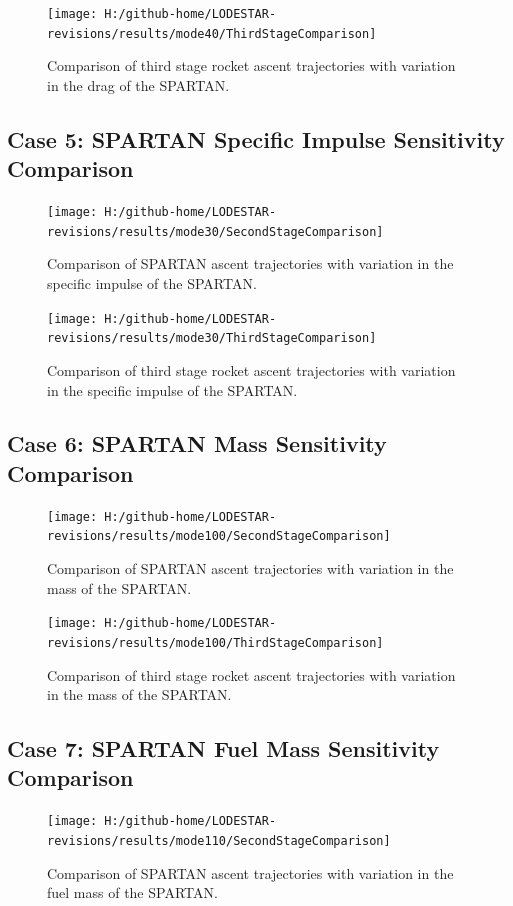 \begin{figure}[!th]
\centering
\texttt{[image: H:/github-home/LODESTAR-revisions/results/mode40/ThirdStageComparison]}
\caption{Comparison of third stage rocket ascent trajectories with variation in the drag of the SPARTAN.}
\label{fig:ThirdStageComparison3}
\end{figure}
\FloatBarrier
\clearpage
\subsection{Case 5: SPARTAN Specific Impulse Sensitivity Comparison}\label{sec:app_comparison30}


\begin{figure}[!th]
	\centering
	\texttt{[image: H:/github-home/LODESTAR-revisions/results/mode30/SecondStageComparison]}
	\caption{Comparison of SPARTAN ascent trajectories with variation in the specific impulse of the SPARTAN.}
	\label{fig:SecondStageComparison2}
	
\end{figure}
\begin{figure}[!th]
	\centering
	\texttt{[image: H:/github-home/LODESTAR-revisions/results/mode30/ThirdStageComparison]}
	\caption{Comparison of third stage rocket ascent trajectories with variation in the specific impulse of the SPARTAN.}
	\label{fig:ThirdStageComparison2}
\end{figure}
\FloatBarrier
\clearpage
\subsection{Case 6: SPARTAN Mass Sensitivity Comparison}\label{sec:app_comparison100}

\begin{figure}[!th]
\centering
\texttt{[image: H:/github-home/LODESTAR-revisions/results/mode100/SecondStageComparison]}
\caption{Comparison of SPARTAN ascent trajectories with variation in the mass of the SPARTAN.}
\label{fig:SecondStageComparison4}
\end{figure}

\begin{figure}[!th]
\centering
\texttt{[image: H:/github-home/LODESTAR-revisions/results/mode100/ThirdStageComparison]}
\caption{Comparison of third stage rocket ascent trajectories with variation in the mass of the SPARTAN.}
\label{fig:ThirdStageComparison4}
\end{figure}
\FloatBarrier
\clearpage
\subsection{Case 7: SPARTAN Fuel Mass Sensitivity Comparison}\label{sec:app_comparison110}
\begin{figure}[!th]
\centering
\texttt{[image: H:/github-home/LODESTAR-revisions/results/mode110/SecondStageComparison]}
\caption{Comparison of SPARTAN ascent trajectories with variation in the fuel mass of the SPARTAN.}
\label{fig:SecondStageComparison5}
\end{figure}


